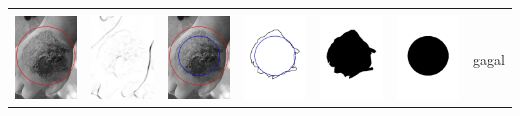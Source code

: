 \begin{table}[H]
\begin{tabular}{|m{0.7in}|m{0.7in}|m{0.7in}|m{0.7in}|m{0.7in}|m{0.7in}|m{0.7in}|}
		&  &  & & & &  \\
		\includegraphics[width=0.7in]{dataset/dataset_3/luka_hitam/ready/31_integer_init.jpg}&
		\includegraphics[width=0.7in]{dataset/dataset_3/luka_hitam/ready/31_integer_ext.jpg}&
		\includegraphics[width=0.7in]{dataset/dataset_3/luka_hitam/ready/31_integer_result.jpg}&
		\includegraphics[width=0.7in]{dataset/dataset_3/luka_hitam/ready/31_gt_r_integer.jpg}&
		\includegraphics[width=0.7in]{dataset/dataset_3/luka_hitam/ready/31_r.jpg}&
		\includegraphics[width=0.7in]{dataset/dataset_3/luka_hitam/ready/31_integer_r.jpg}&
		gagal\\
		\hline
		

\end{tabular}
\end{table}
